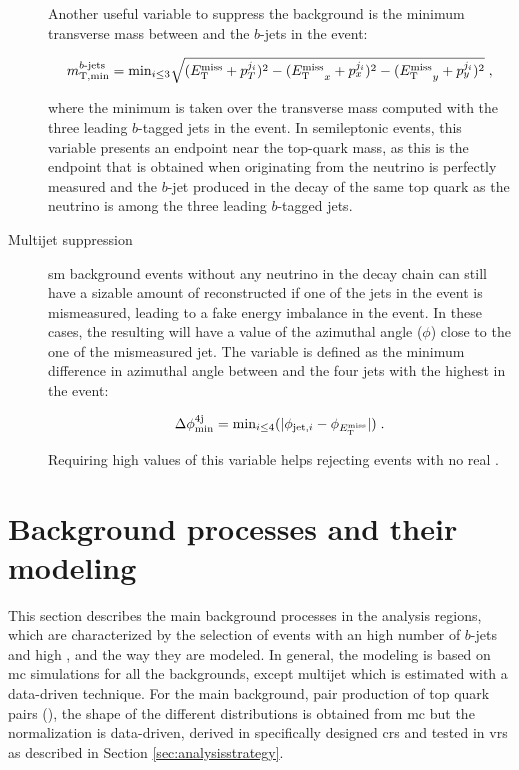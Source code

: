 \begin{description}
Another useful variable to suppress the \ttbar background is the minimum transverse mass between \met and the $b$-jets in the event:

\begin{equation}
m_{\mathrm{T, min}}^{b\textrm{-jets}} =  \mathrm{min}_{i\leq 3}  \sqrt{(E_{\rm T}^{\mathrm{miss}}+p_T^{j_i})^2 - ({E_{\rm T}^{\mathrm{miss}}}_x+p_x^{j_i})^2 - ({E_{\rm T}^{\mathrm{miss}}}_y+p_y^{j_i})^2 } \; , \nonumber
\end{equation}

\noindent where the minimum is taken over the transverse mass computed with the three leading $b$-tagged jets in the event. 
In semileptonic \ttbar events, this variable presents an endpoint near the top-quark mass, as this is the endpoint that is obtained when \met originating from the neutrino is perfectly measured and the $b$-jet produced in the decay of the same top quark as the neutrino is among the three leading $b$-tagged jets. 

\item[Multijet suppression] \gls{sm} background events without any neutrino in the decay chain can still have a sizable amount of reconstructed \met if one of the jets in the 
event is mismeasured, leading to a fake energy imbalance in the event. In these cases, the resulting \met will have a value of the azimuthal angle ($\phi$) close to the one of the mismeasured jet. The variable \dphimin is defined as the minimum difference in azimuthal angle between \met and the  four jets with the highest \pt in the event:

\begin{equation}
\Delta\phi_{\rm{min}}^{4{\rm{j}}} = \textrm{min}_{i \leq 4}(|\phi_{{\rm{jet},}i} - \phi_{E_{\rm T}^{\mathrm{miss}}}|) \; . \nonumber
\end{equation}

\noindent Requiring high values of this variable helps rejecting events with no real \met. 

\end{description}



\section{Background processes and their modeling}
\label{sec:common_backgrounds}

This section describes the main background processes in the analysis regions, 
which are characterized by the selection of events with an high number of $b$-jets and high \met, and the way they are modeled. 
In general, the modeling is based on \gls{mc} simulations for
all the backgrounds, except multijet which is estimated with a data-driven technique.
For the main background, pair production of top quark pairs (\ttbar), the shape of the different distributions is obtained from \gls{mc}
but the normalization is data-driven, derived in specifically designed \glspl{cr} and tested in \glspl{vr} as described in Section \ref{sec:analysisstrategy}.

